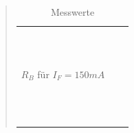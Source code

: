 \begin{quote}
\begin{table}[h]
\begin{addmargin}[-1cm]{3cm}
\begin{tabular}{|p{3cm}|p{3cm}|p{10.2cm}|}
                                 & & \\
                                 & & \\
                                 & & \\
                                 & & \\
                                 & & \\
                                 & & \\
                                 & & \\
                                 & & \\
                                 & & \\
                                 & & \\
                                 & & \\
         \hline
         $R_{B}$ für $I_{F}=150 mA$ & &\\
                                 & & \\
                                 & & \\
                                 & & \\
                                 & & \\
                                 & & \\
                                 & & \\
                                 & & \\
                                 & & \\
                                 & & \\
                                 & & \\
                                 & & \\
                                 & & \\

         \hline

                     \end{tabular}
                 \end{addmargin}
             \caption{Messwerte}
           \label{Messwerte1}
        \end{table}

       \vspace{2em}


\end{quote}
